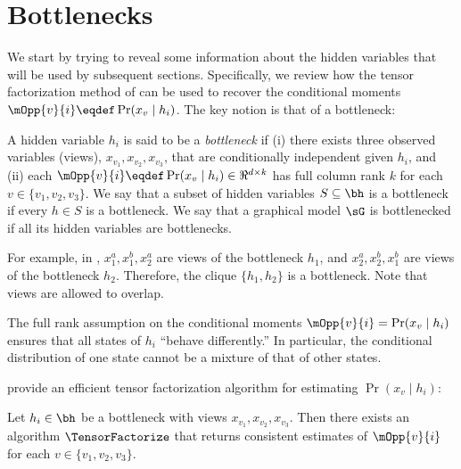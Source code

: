 \section{Bottlenecks}
\label{sec:bottlenecks}

We start by trying to reveal some information about the hidden variables
that will be used by subsequent sections.
Specifically, we review how
the tensor factorization method of \citet{anandkumar13tensor}
can be used to recover the conditional moments
$\mOpp{v}{i} \eqdef \Pr(x_v \mid h_i)$.
The key notion is that of a bottleneck:

\begin{definition}[Bottleneck]
  \label{def:bottleneck}
  A hidden variable $h_i$ is said to be a \emph{bottleneck} if (i) there
  exists three observed variables (views), $x_{v_1}, x_{v_2}, x_{v_3}$,
  that are conditionally independent given $h_i$,
  and (ii) each $\mOpp{v}{i} \eqdef \Pr(x_v \mid h_i) \in \Re^{d \times k}$ has full column rank $k$
  for each $v \in \{v_1, v_2, v_3\}$.
  We say that a subset of hidden variables $S \subseteq \bh$ is a bottleneck
  if every $h \in S$ is a bottleneck.
  We say that a graphical model $\sG$ is bottlenecked if all its hidden variables
  are bottlenecks.
\end{definition}
For example, in , $x_1^a,x_1^b,x_2^a$ are views of the bottleneck $h_1$,
and $x_2^a,x_2^b,x_1^b$ are views of the bottleneck $h_2$.  Therefore, the clique
$\{h_1,h_2\}$ is a bottleneck.  Note that views are allowed to overlap.

The full rank assumption on the conditional moments $\mOpp{v}{i} = \Pr(x_v \mid h_i)$
ensures that all states of $h_i$ ``behave differently.''
In particular, the conditional distribution of one state cannot be
a mixture of that of other states.

%  

\citet{anandkumar12moments} provide an efficient tensor factorization algorithm
for estimating $\Pr(x_v \mid h_i)$:
\begin{theorem}
Let $h_i \in \bh$ be a bottleneck with views $x_{v_1},x_{v_2},x_{v_3}$.
Then there exists an algorithm $\TensorFactorize$ that
returns consistent estimates of $\mOpp{v}{i}$ for each $v \in \{v_1,v_2,v_3\}$.
\end{theorem}

